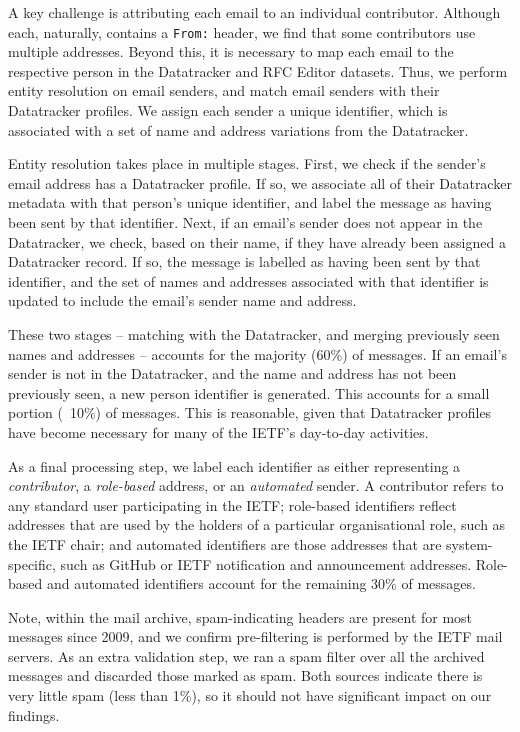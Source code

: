 \documentclass[twocolumn,10pt]{article}
\begin{document}
A key challenge is attributing each email to an individual contributor.
Although each, naturally, contains a \texttt{From:} header, we find that some
contributors use multiple addresses. Beyond this, it is necessary to map
each email to the respective person in the Datatracker and RFC Editor
datasets.  Thus, we perform entity resolution on email senders, and match
email senders with their Datatracker profiles. We assign each sender a
unique identifier, which is associated with a set of name and address
variations from the Datatracker. 

Entity resolution takes place in multiple stages.  First, we check if the
sender's email address has a Datatracker profile. If so, we associate all
of their Datatracker metadata with that person's unique identifier, and
label the message as having been sent by that identifier.  Next, if an
email's sender does not appear in the Datatracker, we check, based on their
name, if they have already been assigned a Datatracker record. If so, the
message is labelled as having been sent by that identifier, and the set of
names and addresses associated with that identifier is updated to include
the email's sender name and address.

These two stages -- matching with the Datatracker, and merging previously
seen names and addresses -- accounts for the majority (60\%) of messages.
If an email's sender is not in the Datatracker, and the name and address
has not been previously seen, a new person identifier is generated. This
accounts for a small portion (~10\%) of messages. This is reasonable, given
that Datatracker profiles have become necessary for many of the IETF's
day-to-day activities.

As a final processing step, we label each identifier as either representing
a \emph{contributor}, a \emph{role-based} address, or an \emph{automated}
sender. A contributor refers to any standard user participating in the
IETF; role-based identifiers reflect addresses that are used by the holders
of a particular organisational role, such as the IETF chair; and automated
identifiers are those addresses that are system-specific, such as GitHub or
IETF notification and announcement addresses. Role-based and automated
identifiers account for the remaining 30\% of messages.

Note, within the mail archive, spam-indicating headers are present for most
messages since 2009, and we confirm pre-filtering is performed by the IETF
mail servers.  As an extra validation step, we ran a spam filter over all
the archived messages and discarded those marked as spam. Both sources
indicate there is very little spam (less than 1\%), so it should not have
significant impact on our findings.
\end{document}
